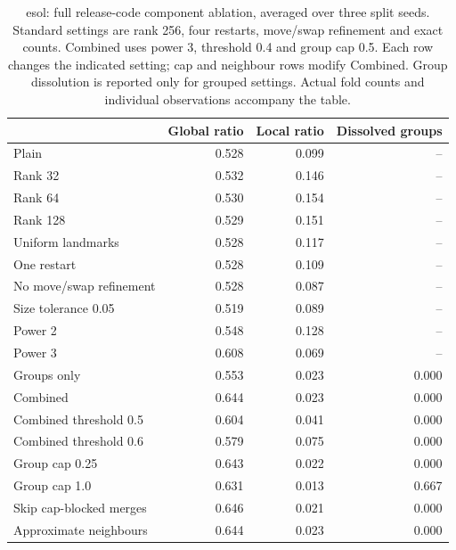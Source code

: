 \begin{table}[htbp]\centering\small
\begin{tabular}{lrrr}
\toprule
 & Global ratio & Local ratio & Dissolved groups \\
\midrule
Plain & 0.528 & 0.099 & -- \\
Rank 32 & 0.532 & 0.146 & -- \\
Rank 64 & 0.530 & 0.154 & -- \\
Rank 128 & 0.529 & 0.151 & -- \\
Uniform landmarks & 0.528 & 0.117 & -- \\
One restart & 0.528 & 0.109 & -- \\
No move/swap refinement & 0.528 & 0.087 & -- \\
Size tolerance 0.05 & 0.519 & 0.089 & -- \\
Power 2 & 0.548 & 0.128 & -- \\
Power 3 & 0.608 & 0.069 & -- \\
Groups only & 0.553 & 0.023 & 0.000 \\
Combined & 0.644 & 0.023 & 0.000 \\
Combined threshold 0.5 & 0.604 & 0.041 & 0.000 \\
Combined threshold 0.6 & 0.579 & 0.075 & 0.000 \\
Group cap 0.25 & 0.643 & 0.022 & 0.000 \\
Group cap 1.0 & 0.631 & 0.013 & 0.667 \\
Skip cap-blocked merges & 0.646 & 0.021 & 0.000 \\
Approximate neighbours & 0.644 & 0.023 & 0.000 \\
\bottomrule
\end{tabular}

\caption{esol: full release-code component ablation, averaged over three split seeds. Standard settings are rank 256, four restarts, move/swap refinement and exact counts. Combined uses power 3, threshold 0.4 and group cap 0.5. Each row changes the indicated setting; cap and neighbour rows modify Combined. Group dissolution is reported only for grouped settings. Actual fold counts and individual observations accompany the table.}\end{table}
